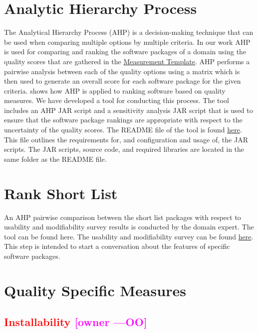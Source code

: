 \documentclass[letterpaper,cleveref]{lipics-v2019}
\newcommand{\authornote}[3]{\textcolor{#1}{[#3 ---#2]}}
\newcommand{\authornote}[3]{}
\newcommand{\oo}[1]{\authornote{magenta}{OO}{#1}} %
\newcommand{\notdone}[1]{\textcolor{red}{#1}}
\theoremstyle{definition}
\begin{document}
\section{Analytic Hierarchy Process} \label{SecAHP}
The Analytical Hierarchy Process (AHP) is a decision-making technique that can be used when comparing multiple options by multiple criteria. In our work AHP is used for comparing and ranking the software packages of a domain using the quality scores that are gathered in the \href{https://github.com/smiths/AIMSS/blob/master/StateOfPractice/Methodology/Combined_MeasurementTemplate_EmpiricalMeasures.xlsx}{Measurement Template}. AHP performs a pairwise analysis between each of the quality options using a matrix which is then used to generate an overall score for each software package for the given criteria. \cite{SmithEtAl2016} shows how AHP is applied to ranking software based on quality measures. We have developed a tool for conducting this process. The tool includes an AHP JAR script and a sensitivity analysis JAR script that is used to ensure that the software package rankings are appropriate with respect to the uncertainty of the quality scores. The README file of the tool is found \href{https://github.com/smiths/AIMSS/blob/master/StateOfPractice/AHP2020/LBM/README.txt}{here}. This file outlines the requirements for, and configuration and usage of, the JAR scripts. The JAR scripts, source code, and required libraries are located in the same folder as the README file.

\section{Rank Short List} \label{SecRankShortList}

An AHP pairwise comparison between the short list packages with respect to usability and modifiability survey results is conducted by the domain expert. The tool can be found here. The usability and modifiability survey can be found \href{https://github.com/smiths/AIMSS/blob/master/StateOfPractice/Methodology/Experiments.pdf}{here}. This step is intended to start a conversation about the features of specific software packages. 



\section{Quality Specific Measures}

\subsection{\notdone{Installability} \oo{owner}}
\end{document}
